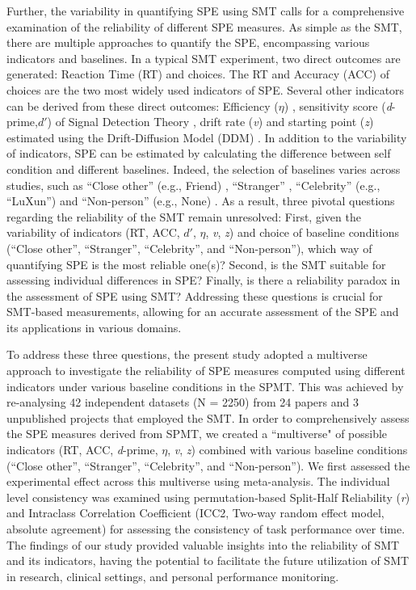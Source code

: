 \documentclass[sn-apa]{sn-jnl}%
\theoremstyle{thmstyleone}%
\theoremstyle{thmstyletwo}%
\theoremstyle{thmstylethree}%
\begin{document}
Further, the variability in quantifying SPE using SMT calls for a comprehensive examination of the reliability of different SPE measures. As simple as the SMT, there are multiple approaches to quantify the SPE, encompassing various indicators and baselines. In a typical SMT experiment, two direct outcomes are generated: Reaction Time (RT) and choices. The RT and Accuracy (ACC) of choices are the two most widely used indicators of SPE. Several other indicators can be derived from these direct outcomes:  Efficiency ($\eta$) \parencite{humphreys2015the,stoeber2008perfectionism}, sensitivity score (\textit{d}-prime,$d'$) of Signal Detection Theory \parencite{hu2020good,sui2012perceptual}, drift rate (\textit{v}) and starting point (\textit{z}) estimated using the Drift-Diffusion Model (DDM) \parencite{macrae2017self,reuther2017does}.  In addition to the variability of indicators, SPE can be estimated by calculating the difference between self condition and different baselines. Indeed, the selection of baselines varies across studies, such as ``Close other” (e.g., Friend) \parencite{navon2021are, svensson2022more}, ``Stranger” \parencite{constable2021affective, orellana2020does}, “Celebrity” (e.g., ``LuXun”) \parencite{qian2020prioritised} and ``Non-person” (e.g., None) \parencite{schafer2019understanding}. As a result, three pivotal questions regarding the reliability of the SMT remain unresolved: First, given the variability of indicators (RT, ACC, $d'$, $\eta$, \textit{v}, \textit{z}) and choice of baseline conditions (``Close other”, ``Stranger”, ``Celebrity”, and ``Non-person”), which way of quantifying SPE is the most reliable one(s)? Second, is the SMT suitable for assessing individual differences in SPE? Finally, is there a reliability paradox in the assessment of SPE using SMT? Addressing these questions is crucial for SMT-based measurements, allowing for an accurate assessment of the SPE and its applications in various domains. 

To address these three questions, the present study adopted a multiverse approach to investigate the reliability of SPE measures computed using different indicators under various baseline conditions in the SPMT. This was achieved by re-analysing 42 independent datasets (N = 2250) from 24 papers and 3 unpublished projects that employed the SMT. In order to comprehensively assess the SPE measures derived from SPMT, we created a ``multiverse" of possible indicators (RT, ACC, \textit{d}-prime, $\eta$, \textit{v}, \textit{z}) combined with various baseline conditions (``Close other”, ``Stranger”, ``Celebrity”, and ``Non-person”). We first assessed the experimental effect across this multiverse using meta-analysis. The individual level consistency was examined using permutation-based Split-Half Reliability (\textit{r}) and Intraclass Correlation Coefficient (ICC2, Two-way random effect model, absolute agreement) for assessing the consistency of task performance over time. The findings of our study provided valuable insights into the reliability of SMT and its indicators, having the potential to facilitate the future utilization of SMT in research, clinical settings, and personal performance monitoring.
\end{document}
